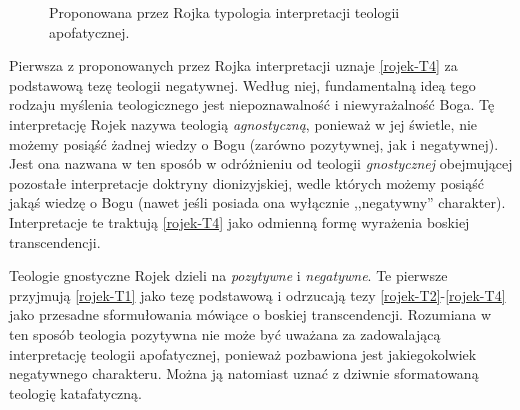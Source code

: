 \begin{figure}[H]
\begin{center}

\caption[Typologia teologii według Rojka]{Proponowana przez Rojka
typologia interpretacji teologii apofatycznej\footnotemark.}\label{roj-typ-rys}
\end{center}
\end{figure}




Pierwsza z proponowanych przez Rojka interpretacji uznaje \eqref{rojek-T4} za
podstawową tezę teologii negatywnej. Według niej, fundamentalną ideą tego
rodzaju myślenia teologicznego jest niepoznawalność i niewyrażalność
Boga. Tę interpretację Rojek nazywa teologią \textit{agnostyczną},
ponieważ w jej świetle, nie możemy posiąść żadnej wiedzy o Bogu
(zarówno pozytywnej, jak i negatywnej). Jest ona nazwana w ten sposób w
odróżnieniu od teologii \textit{gnostycznej} obejmującej pozostałe
interpretacje doktryny dionizyjskiej, wedle których możemy posiąść
jakąś wiedzę o Bogu (nawet jeśli posiada ona wyłącznie ,,negatywny''
charakter). Interpretacje te traktują \eqref{rojek-T4} jako odmienną formę wyrażenia
boskiej transcendencji.

Teologie gnostyczne Rojek dzieli na \textit{pozytywne} i
\textit{negatywne}. Te pierwsze przyjmują \eqref{rojek-T1} jako tezę podstawową i
odrzucają tezy \eqref{rojek-T2}-\eqref{rojek-T4} jako przesadne sformułowania mówiące o
boskiej transcendencji. Rozumiana w ten sposób teologia pozytywna nie
może być uważana za zadowalającą interpretację teologii apofatycznej,
ponieważ pozbawiona jest jakiegokolwiek negatywnego charakteru.
Można ją natomiast uznać z dziwnie sformatowaną teologię
katafatyczną.




